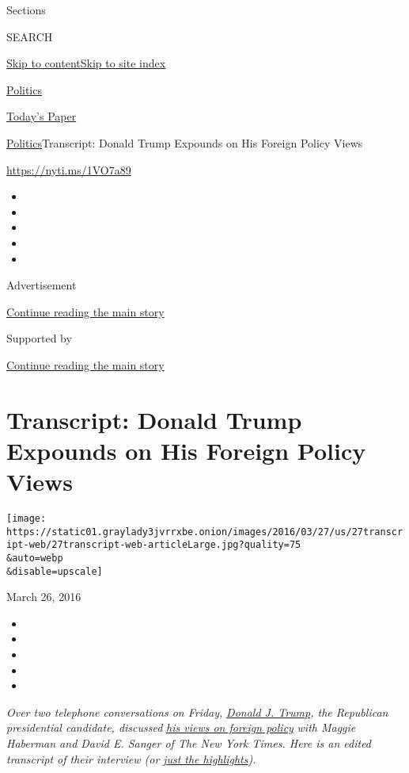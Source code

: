 Sections

SEARCH

\protect\hyperlink{site-content}{Skip to
content}\protect\hyperlink{site-index}{Skip to site index}

\href{https://www.nytimes3xbfgragh.onion/section/politics}{Politics}

\href{https://myaccount.nytimes3xbfgragh.onion/auth/login?response_type=cookie\&client_id=vi}{}

\href{https://www.nytimes3xbfgragh.onion/section/todayspaper}{Today's
Paper}

\href{/section/politics}{Politics}\textbar{}Transcript: Donald Trump
Expounds on His Foreign Policy Views

\url{https://nyti.ms/1VO7a89}

\begin{itemize}
\item
\item
\item
\item
\item
\end{itemize}

Advertisement

\protect\hyperlink{after-top}{Continue reading the main story}

Supported by

\protect\hyperlink{after-sponsor}{Continue reading the main story}

\hypertarget{transcript-donald-trump-expounds-on-his-foreign-policy-views}{%
\section{Transcript: Donald Trump Expounds on His Foreign Policy
Views}\label{transcript-donald-trump-expounds-on-his-foreign-policy-views}}

\texttt{[image: https://static01.graylady3jvrrxbe.onion/images/2016/03/27/us/27transcript-web/27transcript-web-articleLarge.jpg?quality=75\\\&auto=webp\\\&disable=upscale]}

March 26, 2016

\begin{itemize}
\item
\item
\item
\item
\item
\end{itemize}

\emph{Over two telephone conversations on Friday,}
\href{http://www.nytimes3xbfgragh.onion/2016/03/27/us/politics/donald-trump-foreign-policy.html}{\emph{Donald
J. Trump}}\emph{, the Republican presidential candidate, discussed}
\href{http://www.nytimes3xbfgragh.onion/2016/03/27/us/politics/donald-trump-foreign-policy.html}{\emph{his
views on foreign policy}} \emph{with Maggie Haberman and David E. Sanger
of The New York Times. Here is an edited transcript of their interview
(or}
\href{http://www.nytimes3xbfgragh.onion/2016/03/27/us/politics/donald-trump-interview-highlights.html}{\emph{just
the highlights}}\emph{).}

